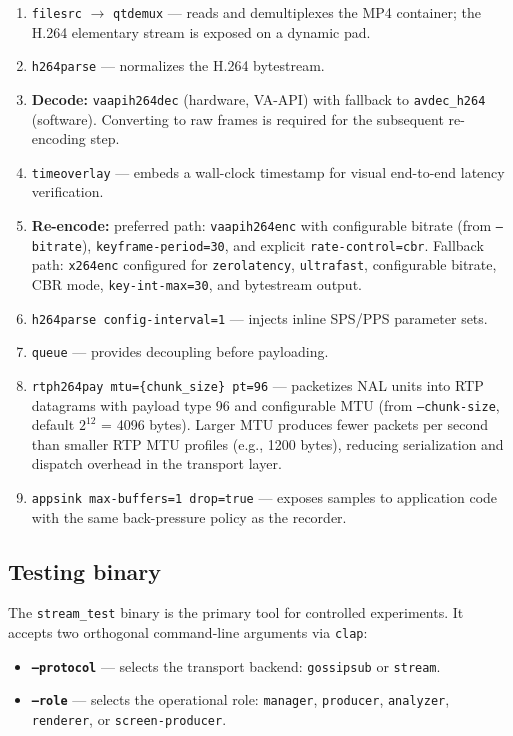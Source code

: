 \begin{enumerate}
    \item \texttt{filesrc} $\rightarrow$ \texttt{qtdemux} --- reads and demultiplexes the MP4 container; the H.264 elementary stream is exposed on a dynamic pad.
    \item \texttt{h264parse} --- normalizes the H.264 bytestream.
    \item \textbf{Decode:} \texttt{vaapih264dec} (hardware, VA-API) with fallback to \texttt{avdec\_h264} (software). Converting to raw frames is required for the subsequent re-encoding step.
    \item \texttt{timeoverlay} --- embeds a wall-clock timestamp for visual end-to-end latency verification.
    \item \textbf{Re-encode:} preferred path: \texttt{vaapih264enc} with configurable bitrate (from \texttt{--bitrate}), \texttt{keyframe-period=30}, and explicit \texttt{rate-control=cbr}. Fallback path: \texttt{x264enc} configured for \texttt{zerolatency}, \texttt{ultrafast}, configurable bitrate, CBR mode, \texttt{key-int-max=30}, and bytestream output.
    \item \texttt{h264parse config-interval=1} --- injects inline SPS/PPS parameter sets.
    \item \texttt{queue} --- provides decoupling before payloading.
    \item \texttt{rtph264pay mtu=\{chunk\_size\} pt=96} --- packetizes NAL units into \ac{RTP} datagrams with payload type 96 and configurable \ac{MTU} (from \texttt{--chunk-size}, default $2^{12}$ = 4096 bytes). Larger \ac{MTU} produces fewer packets per second than smaller \ac{RTP} \ac{MTU} profiles (e.g., 1200 bytes), reducing serialization and dispatch overhead in the transport layer.
    \item \texttt{appsink max-buffers=1 drop=true} --- exposes samples to application code with the same back-pressure policy as the recorder.
\end{enumerate}

\subsection{Testing binary}
\label{sec:test_binary}
The \texttt{stream\_test} binary is the primary tool for controlled experiments. It accepts two orthogonal command-line arguments via \texttt{clap}:

\begin{itemize}
    \item \textbf{\texttt{--protocol}} --- selects the transport backend: \texttt{gossipsub} or \texttt{stream}.
    \item \textbf{\texttt{--role}} --- selects the operational role: \texttt{manager}, \texttt{producer}, \texttt{analyzer}, \texttt{renderer}, or \texttt{screen-producer}.
\end{itemize}

